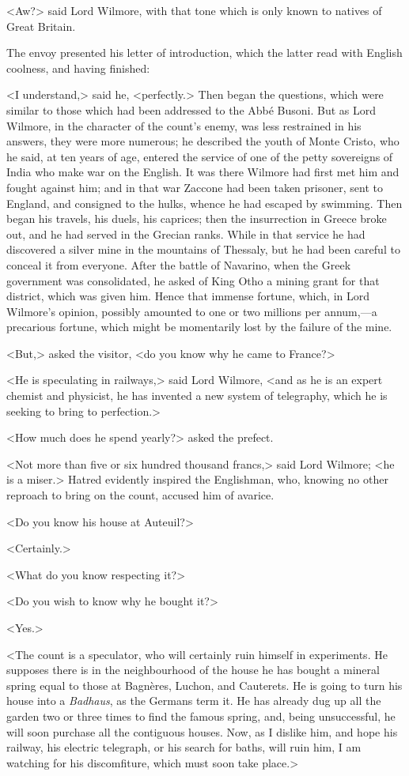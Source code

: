 <Aw?> said Lord Wilmore, with that tone which is only known to natives of Great Britain. 

 The envoy presented his letter of introduction, which the latter read with English coolness, and having finished: 

 <I understand,> said he, <perfectly.>  Then began the questions, which were similar to those which had been addressed to the Abbé Busoni. But as Lord Wilmore, in the character of the count's enemy, was less restrained in his answers, they were more numerous; he described the youth of Monte Cristo, who he said, at ten years of age, entered the service of one of the petty sovereigns of India who make war on the English. It was there Wilmore had first met him and fought against him; and in that war Zaccone had been taken prisoner, sent to England, and consigned to the hulks, whence he had escaped by swimming. Then began his travels, his duels, his caprices; then the insurrection in Greece broke out, and he had served in the Grecian ranks. While in that service he had discovered a silver mine in the mountains of Thessaly, but he had been careful to conceal it from everyone. After the battle of Navarino, when the Greek government was consolidated, he asked of King Otho a mining grant for that district, which was given him. Hence that immense fortune, which, in Lord Wilmore's opinion, possibly amounted to one or two millions per annum,—a precarious fortune, which might be momentarily lost by the failure of the mine. 

 <But,> asked the visitor, <do you know why he came to France?> 

 <He is speculating in railways,> said Lord Wilmore, <and as he is an expert chemist and physicist, he has invented a new system of telegraphy, which he is seeking to bring to perfection.> 

 <How much does he spend yearly?> asked the prefect. 

 <Not more than five or six hundred thousand francs,> said Lord Wilmore; <he is a miser.> Hatred evidently inspired the Englishman, who, knowing no other reproach to bring on the count, accused him of avarice. 

 <Do you know his house at Auteuil?> 

 <Certainly.> 

 <What do you know respecting it?> 

 <Do you wish to know why he bought it?> 

 <Yes.> 

 <The count is a speculator, who will certainly ruin himself in experiments. He supposes there is in the neighbourhood of the house he has bought a mineral spring equal to those at Bagnères, Luchon, and Cauterets. He is going to turn his house into a \textit{Badhaus}, as the Germans term it. He has already dug up all the garden two or three times to find the famous spring, and, being unsuccessful, he will soon purchase all the contiguous houses. Now, as I dislike him, and hope his railway, his electric telegraph, or his search for baths, will ruin him, I am watching for his discomfiture, which must soon take place.> 

